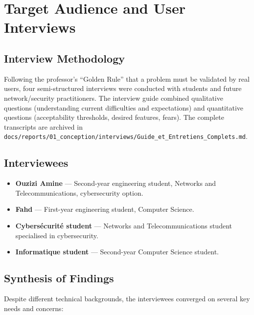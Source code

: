 \documentclass[12pt,a4paper]{report}
\begin{document}
\section{Target Audience and User Interviews}\label{sec:interviews}

\subsection{Interview Methodology}

Following the professor's ``Golden Rule'' that a problem must be validated by real users, four semi-structured interviews were conducted with students and future network/security practitioners. The interview guide combined qualitative questions (understanding current difficulties and expectations) and quantitative questions (acceptability thresholds, desired features, fears). The complete transcripts are archived in \texttt{docs/reports/01\_conception/interviews/Guide\_et\_Entretiens\_Complets.md}.

\subsection{Interviewees}

\begin{itemize}
    \item \textbf{Ouzizi Amine} --- Second-year engineering student, Networks and Telecommunications, cybersecurity option.
    \item \textbf{Fahd} --- First-year engineering student, Computer Science.
    \item \textbf{Cybers\'{e}curit\'{e} student} --- Networks and Telecommunications student specialised in cybersecurity.
    \item \textbf{Informatique student} --- Second-year Computer Science student.
\end{itemize}

\subsection{Synthesis of Findings}

Despite different technical backgrounds, the interviewees converged on several key needs and concerns:
\end{document}
